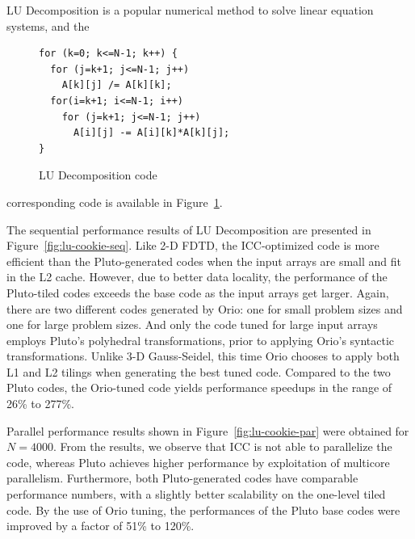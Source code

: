 LU Decomposition is a popular numerical method to solve linear
equation systems, and the 
%
\begin{figure}
\begin{center}
\vspace{-.25in}
\begin{minipage}{2.8in} 
\scriptsize
\begin{verbatim} 
for (k=0; k<=N-1; k++) { 
  for (j=k+1; j<=N-1; j++) 
    A[k][j] /= A[k][k]; 
  for(i=k+1; i<=N-1; i++) 
    for (j=k+1; j<=N-1; j++) 
      A[i][j] -= A[i][k]*A[k][j]; 
} 
\end{verbatim} 
\end{minipage} 
\end{center}
\vspace{-0.2in}
\caption{LU Decomposition code} 
\label{fig:lu-code} 
\end{figure}
%
corresponding code is available in Figure~\ref{fig:lu-code}. 

The sequential performance results of LU Decomposition are presented
in Figure~\ref{fig:lu-cookie-seq}. Like 2-D FDTD, the ICC-optimized
code is more efficient than the Pluto-generated codes when the input
arrays are small and fit in the L2 cache. However, due to better data
locality, the performance of the Pluto-tiled codes exceeds the base
code as the input arrays get larger. Again, there are two different
codes generated by Orio: one for small problem sizes and one for large
problem sizes. And only the code tuned for large input arrays employs
Pluto's polyhedral transformations, prior to applying Orio's syntactic
transformations. Unlike 3-D Gauss-Seidel, this time Orio chooses to
apply both L1 and L2 tilings when generating the best tuned
code. Compared to the two Pluto codes, the Orio-tuned code yields
performance speedups in the range of 26\% to 277\%.

Parallel performance results shown in Figure~\ref{fig:lu-cookie-par}
were obtained for $N=4000$. From the results, we observe that ICC is
not able to parallelize the code, whereas Pluto achieves higher
performance by exploitation of multicore parallelism. Furthermore,
both Pluto-generated codes have comparable performance numbers, with a
slightly better scalability on the one-level tiled code. By the use of
Orio tuning, the performances of the Pluto base codes were improved by
a factor of 51\% to 120\%.
 
